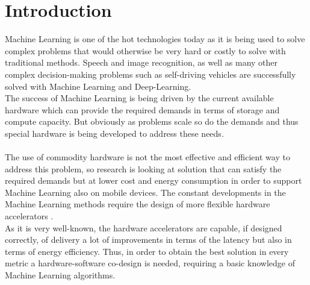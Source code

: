 \chapter{Introduction}
Machine Learning is one of the hot technologies today as it is being used to solve complex problems that would otherwise be very hard or costly to solve with traditional methods. Speech and image recognition, as well as many other complex decision-making problems such as self-driving vehicles are successfully solved with Machine Learning and Deep-Learning. \\
The success of Machine Learning is being driven by the current available hardware which can provide the required demands in terms of storage and compute capacity. But obviously as problems scale so do the demands and thus special hardware is being developed to address these needs. \\\\
The use of commodity hardware is not the most effective and efficient way to address this problem, so research is looking at solution that can satisfy the required demands but at lower cost and energy consumption in order to support Machine Learning also on mobile devices.
The constant developments in the Machine Learning methods require the design of more flexible hardware accelerators \cite{paper:1} \cite{paper:2}.\\
As it is very well-known, the hardware accelerators are capable, if designed correctly, of delivery a lot of improvements in terms of the latency but also in terms of energy efficiency\cite{paper:29}. Thus, in order to obtain the best solution in every metric a hardware-software co-design is needed, requiring a basic knowledge of Machine Learning algorithms.\\\\

